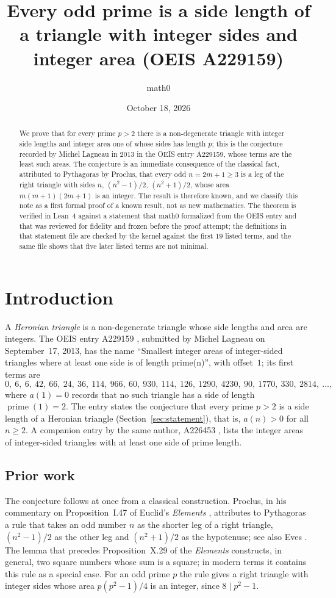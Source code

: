 \documentclass[11pt]{amsart}
\title[Every odd prime is a side of a Heronian triangle]{Every odd prime is a side length of a triangle with integer sides and integer area (OEIS A229159)}
\author{math0}
\date{October 18, 2026}
\theoremstyle{plain}
\theoremstyle{definition}
\newcommand{\pr}{\operatorname{prime}}
\begin{document}
\begin{abstract}
We prove that for every prime $p>2$ there is a non-degenerate triangle with integer side lengths and integer area one of whose sides has length $p$; this is the conjecture recorded by Michel Lagneau in 2013 in the OEIS entry A229159, whose terms are the least such areas.
The conjecture is an immediate consequence of the classical fact, attributed to Pythagoras by Proclus, that every odd $n=2m+1\ge 3$ is a leg of the right triangle with sides $n$, $(n^2-1)/2$, $(n^2+1)/2$, whose area $m(m+1)(2m+1)$ is an integer.
The result is therefore known, and we classify this note as a first formal proof of a known result, not as new mathematics.
The theorem is verified in Lean~4 against a statement that math0 formalized from the OEIS entry and that was reviewed for fidelity and frozen before the proof attempt; the definitions in that statement file are checked by the kernel against the first $19$ listed terms, and the same file shows that five later listed terms are not minimal.
\end{abstract}
\maketitle

\section{Introduction}

A \emph{Heronian triangle} is a non-degenerate triangle whose side lengths and area are integers.
The OEIS entry A229159 \cite{A229159}, submitted by Michel Lagneau on September~17, 2013, has the name ``Smallest integer areas of integer-sided triangles where at least one side is of length prime(n)'', with offset~$1$; its first terms are
\[
  0,\ 6,\ 6,\ 42,\ 66,\ 24,\ 36,\ 114,\ 966,\ 60,\ 930,\ 114,\ 126,\ 1290,\ 4230,\ 90,\ 1770,\ 330,\ 2814,\ \dots,
\]
where $a(1)=0$ records that no such triangle has a side of length $\pr(1)=2$.
The entry states the conjecture that every prime $p>2$ is a side length of a Heronian triangle (Section~\ref{sec:statement}), that is, $a(n)>0$ for all $n\ge2$.
A companion entry by the same author, A226453 \cite{A226453}, lists the integer areas of integer-sided triangles with at least one side of prime length.

\subsection*{Prior work}
The conjecture follows at once from a classical construction.
Proclus, in his commentary on Proposition~I.47 of Euclid's \emph{Elements} \cite{Proclus}, attributes to Pythagoras a rule that takes an odd number $n$ as the shorter leg of a right triangle, $(n^2-1)/2$ as the other leg and $(n^2+1)/2$ as the hypotenuse; see also Eves \cite[Sec.~3-4]{Eves}.
The lemma that precedes Proposition~X.29 of the \emph{Elements} \cite[vol.~3]{Heath} constructs, in general, two square numbers whose sum is a square; in modern terms it contains this rule as a special case.
For an odd prime $p$ the rule gives a right triangle with integer sides whose area $p(p^2-1)/4$ is an integer, since $8\mid p^2-1$.
\end{document}
